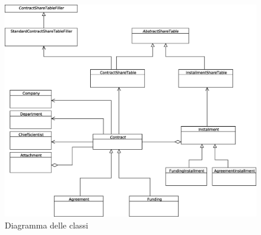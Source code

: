 \begin{figure}[h]
  \caption{Diagramma delle classi}
  \label{model_business}
  \centering
    \includegraphics[width=1\textwidth]{images/modello_business.eps}
\end{figure}
